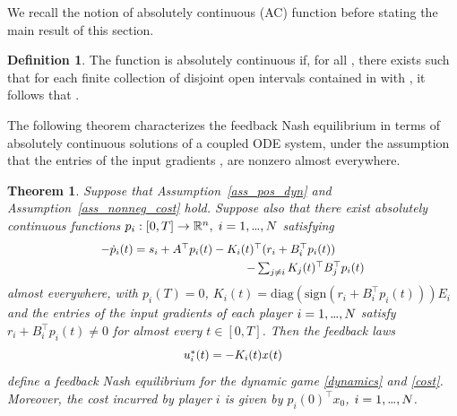\documentclass[letterpaper, 10 pt, conference]{ieeeconf}
\newcommand\mydots{\hbox to 0.7em{.\hss.\hss.}}
\newtheorem{thm}{Theorem}
\theoremstyle{definition}
\newtheorem{defn}{Definition}
\begin{document}
We recall the notion of absolutely continuous (AC) function before stating the main result of this section.
\begin{defn}
    The function  is absolutely continuous if, for all , there exists  such that for each finite collection \scalebox{.95}{$\big\{(a_1, b_1),\mydots, (a_n, b_n)\big\}$} of disjoint open intervals contained in \scalebox{.95}{$[a,b]$} with , it follows that .  
\end{defn}
The following theorem characterizes the feedback Nash equilibrium in terms of absolutely continuous solutions of a coupled ODE system, under the assumption that the entries of the input gradients %
, \scalebox{.95}{$i=1,\mydots, N$} are nonzero almost everywhere. %
\begin{thm}\label{finite-hor}
    Suppose that Assumption~\ref{ass_pos_dyn} and Assumption~\ref{ass_nonneg_cost} hold.  Suppose also that there exist absolutely continuous functions $p_i:[0,T]\rightarrow \mathbb R^n, \hspace{1mm} i=1,\mydots, N$ satisfying
    \begin{align}\label{ODEs}
    &\scalebox{.94}{$-\dot p_i(t) =s_i+ A^{\top}p_i(t)-K_i(t)^{\top}(r_i+ B_i^{\top}p_i(t))$}\\
    &~~~~~~~~~~~~~~~~~~~~~~~~~~~~~~~~~~~\scalebox{.94}{$-\textstyle\sum\nolimits_{j \neq i} 
    K_j(t)^{\top}B_j^{\top}p_i(t)$} \notag
\end{align} 
almost everywhere, with $p_i(T)=0$, $K_i(t)=\mathrm{diag}(\mathrm{sign}(r_i+B^{\top}_i p_i(t)))E_i$ and the entries of the input gradients of each player $i=1,\mydots, N$ satisfy $r_i+B_i^{\top}p_i(t) \neq 0$ for almost every $t\in [0,T]$. Then the feedback laws   \begin{align}\label{Nash_fin}
        \scalebox{.95}{$u_{i}^*(t)= -K_i(t)x(t)$}
    \end{align}
define a feedback Nash equilibrium for the dynamic game \eqref{dynamics} and \eqref{cost}. Moreover, the cost incurred by player $i$ is given by $p_i(0)^{\top}x_0$, $i=1,\mydots, N$.
\end{thm}
\end{document}
